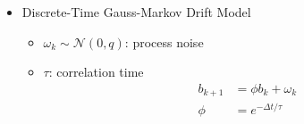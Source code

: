 \documentclass{article}
\begin{document}
\begin{itemize}
\begin{itemize}
\begin{align*}
        \end{align*}
    \end{itemize}
    \item Discrete-Time Gauss-Markov Drift Model
    \begin{itemize}
        \item $\omega_k \sim \mathcal{N}(0,q)$: process noise
        \item $\tau$: correlation time
        \begin{align*}
            b_{k+1} &= \phi b_k + \omega_k \\
            \phi &= e^{-\Delta t/ \tau}
        \end{align*}
    \end{itemize}
\end{itemize}
\end{document}
